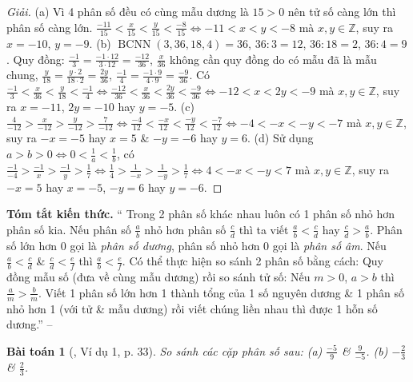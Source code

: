 \documentclass{article}
\newtheorem{baitoan}{Bài toán}
\begin{document}
\begin{proof}[Giải]
	(a) Vì 4 phân số đều có cùng mẫu dương là $15 > 0$ nên tử số càng lớn thì phân số càng lớn. $\frac{-11}{15} < \frac{x}{15} < \frac{y}{15} < \frac{-8}{15}\Leftrightarrow-11 < x < y < -8$ mà $x,y\in\mathbb{Z}$, suy ra $x = -10$, $y = -9$. (b) $\operatorname{BCNN}(3,36,18,4) = 36$, $36:3 = 12$, $36:18 = 2$, $36:4 = 9$. Quy đồng: $\frac{-1}{3} = \frac{-1\cdot12}{3\cdot12} = \frac{-12}{36}$, $\frac{x}{36}$ không cần quy đồng do có mẫu đã là mẫu chung, $\frac{y}{18} = \frac{y\cdot2}{18\cdot2} = \frac{2y}{36}$, $\frac{-1}{4} = \frac{-1\cdot9}{4\cdot9} = \frac{-9}{36}$. Có $\frac{-1}{3} < \frac{x}{36} < \frac{y}{18} < \frac{-1}{4}\Leftrightarrow\frac{-12}{36} < \frac{x}{36} < \frac{2y}{36} < \frac{-9}{36}\Leftrightarrow -12 < x < 2y < -9$ mà $x,y\in\mathbb{Z}$, suy ra $x = -11$, $2y = -10$ hay $y = -5$. (c) $\frac{4}{-12} > \frac{x}{-12} > \frac{y}{-12} > \frac{7}{-12}\Leftrightarrow\frac{-4}{12} < \frac{-x}{12} < \frac{-y}{12} < \frac{-7}{12}\Leftrightarrow -4 < -x < -y < -7$ mà $x,y\in\mathbb{Z}$, suy ra $-x = -5$ hay $x = 5$ \& $-y = -6$ hay $y = 6$. (d) Sử dụng $a > b > 0\Leftrightarrow0 < \frac{1}{a} < \frac{1}{b}$, có $\frac{-1}{-4} > \frac{-1}{x} > \frac{-1}{y} > \frac{1}{7}\Leftrightarrow\frac{1}{4} > \frac{1}{-x} > \frac{1}{-y} > \frac{1}{7}\Leftrightarrow 4 < -x < -y < 7$ mà $x,y\in\mathbb{Z}$, suy ra $-x = 5$ hay $x = -5$, $-y = 6$ hay $y = -6$.
\end{proof}
\noindent\textsf{\textbf{Tóm tắt kiến thức.}} `` Trong 2 phân số khác nhau luôn có 1 phân số nhỏ hơn phân số kia. Nếu phân số $\frac{a}{b}$ nhỏ hơn phân số $\frac{c}{d}$ thì ta viết $\frac{a}{b} < \frac{c}{d}$ hay $\frac{c}{d} > \frac{a}{b}$. Phân số lớn hơn 0 gọi là \textit{phân số dương}, phân số nhỏ hơn 0 gọi là \textit{phân số âm}. Nếu $\frac{a}{b} < \frac{c}{d}$ \& $\frac{c}{d} < \frac{e}{f}$ thì $\frac{a}{b} <\frac{e}{f}$. Có thể thực hiện so sánh 2 phân số bằng cách: Quy đồng mẫu số (đưa về cùng mẫu dương) rồi so sánh tử số: Nếu $m > 0$, $a > b$ thì $\frac{a}{m} > \frac{b}{m}$.  Viết 1 phân số lớn hơn 1 thành tổng của 1 số nguyên dương \& 1 phân số nhỏ hơn 1 (với tử \& mẫu dương) rồi viết chúng liền nhau thì được 1 hỗn số dương.'' -- \cite[Chap. V, \S2, pp. 32--33]{SBT_Toan_6_Canh_Dieu_tap_2}

\begin{baitoan}[\cite{SBT_Toan_6_Canh_Dieu_tap_2}, Ví dụ 1, p. 33]
	So sánh các cặp phân số sau: (a) $\frac{-5}{9}$ \& $\frac{9}{-5}$. (b) $-\frac{2}{3}$ \& $\frac{2}{3}$.
\end{baitoan}
\end{document}
